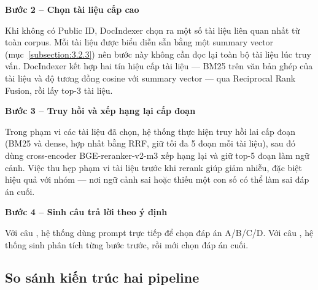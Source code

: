 \documentclass[../DoAn.tex]{subfiles}
\begin{document}
\noindent\textbf{Bước 2 -- Chọn tài liệu cấp cao}

Khi không có Public ID, DocIndexer chọn ra một số tài liệu liên quan nhất từ toàn corpus. Mỗi tài liệu được biểu diễn sẵn bằng một summary vector (mục~\ref{subsection:3.2.3}) nên bước này không cần đọc lại toàn bộ tài liệu lúc truy vấn. DocIndexer kết hợp hai tín hiệu cấp tài liệu --- BM25 trên văn bản ghép của tài liệu và độ tương đồng cosine với summary vector --- qua Reciprocal Rank Fusion, rồi lấy top-3 tài liệu.

\noindent\textbf{Bước 3 -- Truy hồi và xếp hạng lại cấp đoạn}

Trong phạm vi các tài liệu đã chọn, hệ thống thực hiện truy hồi lai cấp đoạn (BM25 và dense, hợp nhất bằng RRF, giữ tối đa 5 đoạn mỗi tài liệu), sau đó dùng cross-encoder BGE-reranker-v2-m3 xếp hạng lại và giữ top-5 đoạn làm ngữ cảnh. Việc thu hẹp phạm vi tài liệu trước khi rerank giúp giảm nhiễu, đặc biệt hiệu quả với nhóm  --- nơi ngữ cảnh sai hoặc thiếu một con số có thể làm sai đáp án cuối.

\noindent\textbf{Bước 4 -- Sinh câu trả lời theo ý định}

Với câu , hệ thống dùng prompt trực tiếp để chọn đáp án A/B/C/D. Với câu , hệ thống sinh phân tích từng bước trước, rồi mới chọn đáp án cuối.

\subsection{So sánh kiến trúc hai pipeline}
\label{subsection:3.3.3}
\end{document}
